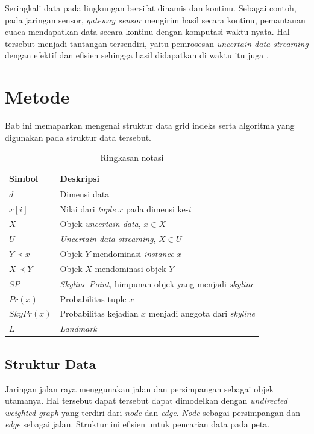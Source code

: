 \documentclass[conference]{IEEEtran}
\begin{document}
Seringkali data pada lingkungan bersifat dinamis dan kontinu. Sebagai contoh, pada jaringan sensor, \textit{gateway sensor} mengirim hasil secara kontinu, pemantauan cuaca mendapatkan data secara kontinu dengan komputasi waktu nyata. Hal tersebut menjadi tantangan tersendiri, yaitu pemrosesan \textit{uncertain data streaming} dengan efektif dan efisien sehingga hasil didapatkan di waktu itu juga \cite{effectiveprob}.

\section{Metode}
Bab ini memaparkan mengenai struktur data grid indeks serta algoritma yang digunakan pada struktur data tersebut.

\begin{table}[htbp]
	\caption{Ringkasan notasi}
	\begin{center}
		\begin{tabular}{| p{2cm} | p{5cm} |}
		\hline
		\textbf{Simbol} & \textbf{Deskripsi} \\ \hline
		$ d $ & Dimensi data \\ \hline
		$ x[i] $ & Nilai dari \textit{tuple} $ x $ pada dimensi ke-$ i $  \\ \hline
		$ X $ & Objek \textit{uncertain data}, $ x \in X $ \\ \hline
		$ U $ & \textit{Uncertain data streaming}, $ X \in U $ \\ \hline
		$ Y \prec x $ & Objek $ Y $ mendominasi \textit{instance} $ x $ \\ \hline
		$ X \prec Y $ & Objek $ X $ mendominasi objek $ Y $ \\ \hline
		$ SP $ & \textit{Skyline Point}, himpunan objek yang menjadi \textit{skyline} \\ \hline
		$ Pr(x) $ & Probabilitas tuple $ x $ \\ \hline
		$ SkyPr(x) $ & Probabilitas kejadian $ x $ menjadi anggota dari \textit{skyline} \\ \hline
		$ L $ & \textit{Landmark} \\
		\hline
		\end{tabular}
		\label{tab:istilah-bab3}
	\end{center}
\end{table}

\subsection{Struktur Data}
Jaringan jalan raya menggunakan jalan dan persimpangan sebagai objek utamanya. Hal tersebut dapat tersebut dapat dimodelkan dengan \textit{undirected weighted graph} yang terdiri dari \textit{node} dan \textit{edge}. \textit{Node} sebagai persimpangan dan \textit{edge} sebagai jalan. Struktur ini efisien untuk pencarian data pada peta.
\end{document}

